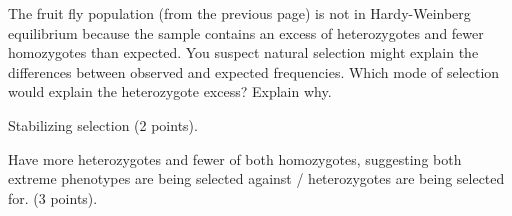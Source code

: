 \question[5]
The fruit fly population (from the previous page) is not in Hardy-Weinberg equilibrium because the sample contains an excess of heterozygotes and fewer homozygotes than expected.  You suspect natural selection might explain the differences between observed and expected frequencies.  Which mode of selection would explain the heterozygote excess?  Explain why. 

\begin{solution}
Stabilizing selection (2 points). 

Have more heterozygotes and fewer of both homozygotes, suggesting both extreme phenotypes are being selected against / heterozygotes are being selected for. (3 points).

\end{solution}
